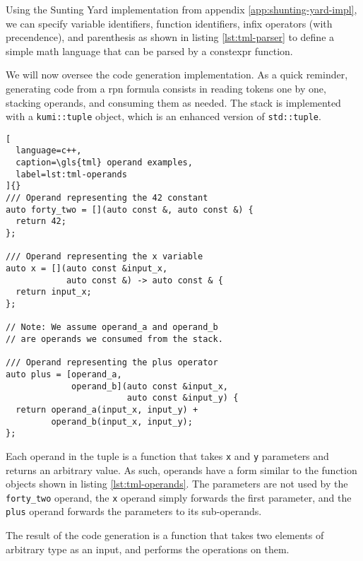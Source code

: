 \documentclass[../main]{subfiles}
\begin{document}
Using the Sunting Yard implementation from
appendix \ref{app:shunting-yard-impl}, we can specify variable identifiers,
function identifiers, infix operators (with precendence), and parenthesis
as shown in listing \ref{lst:tml-parser} to define a simple math language
that can be parsed by a \gls{constexpr} function.

We will now oversee the code generation implementation.
As a quick reminder, generating code from a \gls{rpn} formula
consists in reading tokens one by one, stacking operands, and consuming
them as needed. The stack is implemented with a \lstinline{kumi::tuple} object,
which is an enhanced version of \lstinline{std::tuple}.

\begin{lstlisting}[
  language=c++,
  caption=\gls{tml} operand examples,
  label=lst:tml-operands
]{}
/// Operand representing the 42 constant
auto forty_two = [](auto const &, auto const &) {
  return 42;
};

/// Operand representing the x variable
auto x = [](auto const &input_x,
            auto const &) -> auto const & {
  return input_x;
};

// Note: We assume operand_a and operand_b
// are operands we consumed from the stack.

/// Operand representing the plus operator
auto plus = [operand_a,
             operand_b](auto const &input_x,
                        auto const &input_y) {
  return operand_a(input_x, input_y) +
         operand_b(input_x, input_y);
};
\end{lstlisting}

Each operand in the tuple is a function that takes \lstinline{x} and
\lstinline{y} parameters and returns an arbitrary value.
As such, operands have a form similar to the function
objects shown in listing \ref{lst:tml-operands}.
The parameters are not used by the \lstinline{forty_two} operand,
the \lstinline{x} operand simply forwards the first parameter,
and the \lstinline{plus} operand forwards the parameters to its sub-operands.

The result of the code generation is a function that takes two elements of
arbitrary type as an input, and performs the operations on them.
\end{document}
